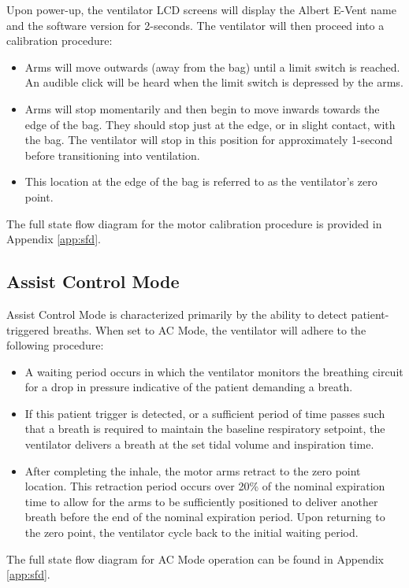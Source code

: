 \documentclass[]{article}
\begin{document}
Upon power-up, the ventilator LCD screens will display the Albert E-Vent name and the software version for 2-seconds.  The ventilator will then proceed into a calibration procedure:
\begin{itemize}
	\item Arms will move outwards (away from the bag) until a limit switch is reached.  An audible click will be heard when the limit switch is depressed by the arms.
	\item Arms will stop momentarily and then begin to move inwards towards the edge of the bag.  They should stop just at the edge, or in slight contact, with the bag.  The ventilator will stop in this position for approximately 1-second before transitioning into ventilation.
	\item This location at the edge of the bag is referred to as the ventilator's zero point.
\end{itemize}
The full state flow diagram for the motor calibration procedure is provided in Appendix \ref{app:sfd}.


\subsection{Assist Control Mode}
\label{sect:acMode}
Assist Control Mode is characterized primarily by the ability to detect patient-triggered breaths.  When set to AC Mode, the ventilator will adhere to the following procedure:
\begin{itemize}
	\item A waiting period occurs in which the ventilator monitors the breathing circuit for a drop in pressure indicative of the patient demanding a breath.
	\item If this patient trigger is detected, or a sufficient period of time passes such that a breath is required to maintain the baseline respiratory setpoint, the ventilator delivers a breath at the set tidal volume and inspiration time.
	\item After completing the inhale, the motor arms retract to the zero point location.  This retraction period occurs over 20\% of the nominal expiration time to allow for the arms to be sufficiently positioned to deliver another breath before the end of the nominal expiration period.  Upon returning to the zero point, the ventilator cycle back to the initial waiting period. 
\end{itemize}
The full state flow diagram for AC Mode operation can be found in Appendix \ref{app:sfd}.
\end{document}
